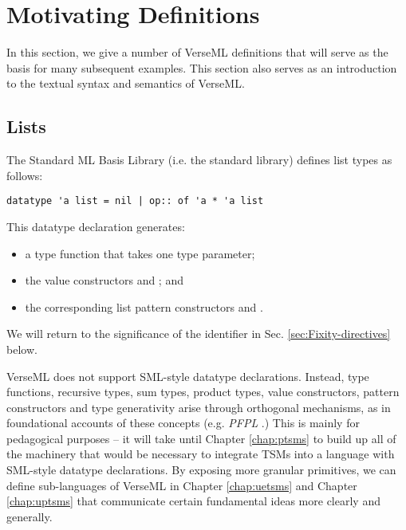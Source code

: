 

\section{Motivating Definitions}\label{sec:motivating-examples}
In this section, we give a number of VerseML definitions that will serve as the basis for many subsequent examples. This section also serves as an introduction to the textual syntax and semantics of VerseML.

\subsection{Lists}\label{sec:lists}
The Standard ML Basis Library (i.e.  the standard library) defines list types as follows:
\begin{lstlisting}[numbers=none]
datatype 'a list = nil | op:: of 'a * 'a list
\end{lstlisting}
This datatype declaration generates:
\begin{itemize}
\item a type function  that takes one type parameter; 
\item the value constructors  and ; and
\item the corresponding list pattern constructors  and .
\end{itemize}
We will return to the significance of the identifier  in Sec. \ref{sec:Fixity-directives} below.

VerseML does not support SML-style datatype declarations. Instead, type functions, recursive types, sum types, product types, value constructors, pattern constructors and type generativity arise through orthogonal mechanisms, as in foundational accounts of these concepts (e.g. \emph{PFPL} \cite{pfpl}.) This is mainly for pedagogical purposes -- it will take until Chapter \ref{chap:ptsms} to build up all of the machinery that would be necessary to integrate TSMs into a language with SML-style datatype declarations. By exposing more granular primitives, we can define sub-languages of VerseML in Chapter \ref{chap:uetsms} and Chapter \ref{chap:uptsms} that communicate certain fundamental ideas more clearly and generally.

